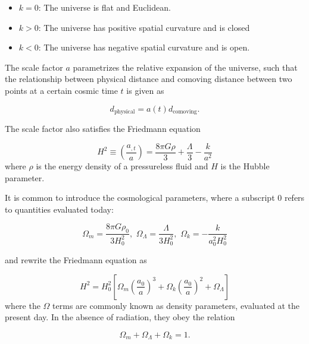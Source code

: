 \begin{itemize}
  \item $k = 0$: The universe is flat and Euclidean.
  \item $k > 0$: The universe has positive spatial curvature and is closed
  \item $k < 0$: The universe has negative spatial curvature and is open. 
\end{itemize}

The scale factor $a$ parametrizes the relative expansion of the universe, such that the relationship between physical distance and comoving distance between two points at a certain cosmic time $t$ is given as

\begin{equation}
  d_{\text{physical}} = a(t) d_{\text{comoving}}.
  \label{eq:comoving-physical-distance}
\end{equation}

The scale factor also satisfies the Friedmann equation

\begin{equation}
  H^2 \equiv \left ( \frac{a_{,t}}{a} \right ) = \frac{8\pi G \rho}{3} + \frac{\Lambda}{3} - \frac{k}{a^2}
  \label{eq:friedmann-equation}
\end{equation}
where $\rho$ is the energy density of a pressureless fluid and $H$ is the Hubble parameter. 

It is common to introduce the cosmological parameters, where a subscript 0 refers to quantities evaluated today: 

\begin{equation}
  \Omega_m = \frac{8\pi G \rho_0}{3H_0^2}, \,\, \Omega_{\Lambda} = \frac{\Lambda}{3H_0^2}, \,\, \Omega_k = - \frac{k}{a_0^2 H_0^2}
  \label{eq:cosmo-params}
\end{equation}

and rewrite the Friedmann equation as

\begin{equation}
  H^2 = H_0^2 \left [ \Omega_m \left ( \frac{a_0}{a}\right )^3 + \Omega_k \left ( \frac{a_0}{a}\right )^2 + \Omega_{\Lambda} \right ]
  \label{eq:friedmann-eqn-version2}
\end{equation}
where the $\Omega$ terms are commonly known as density parameters, evaluated at the present day. In the absence of radiation, they obey the relation

\begin{equation}
  \Omega_m + \Omega_{\Lambda} + \Omega_k = 1.
  \label{eq:density-parameters-1}   
\end{equation} 

